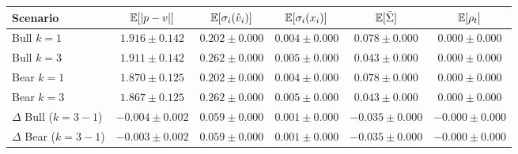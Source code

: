 \begin{tabular}{lccccc}
\hline
Scenario & $\mathbb{E}[|p-v|]$ & $\mathbb{E}[\sigma_i(\hat v_i)]$ & $\mathbb{E}[\sigma_i(x_i)]$ & $\mathbb{E}[\bar\Sigma]$ & $\mathbb{E}[\rho_t]$ \\
\hline
Bull $k=1$ & $1.916\pm0.142$ & $0.202\pm0.000$ & $0.004\pm0.000$ & $0.078\pm0.000$ & $0.000\pm0.000$ \\
Bull $k=3$ & $1.911\pm0.142$ & $0.262\pm0.000$ & $0.005\pm0.000$ & $0.043\pm0.000$ & $0.000\pm0.000$ \\
Bear $k=1$ & $1.870\pm0.125$ & $0.202\pm0.000$ & $0.004\pm0.000$ & $0.078\pm0.000$ & $0.000\pm0.000$ \\
Bear $k=3$ & $1.867\pm0.125$ & $0.262\pm0.000$ & $0.005\pm0.000$ & $0.043\pm0.000$ & $0.000\pm0.000$ \\
$\Delta$ Bull ($k=3-1$) & $-0.004\pm0.002$ & $0.059\pm0.000$ & $0.001\pm0.000$ & $-0.035\pm0.000$ & $-0.000\pm0.000$ \\
$\Delta$ Bear ($k=3-1$) & $-0.003\pm0.002$ & $0.059\pm0.000$ & $0.001\pm0.000$ & $-0.035\pm0.000$ & $-0.000\pm0.000$ \\
\hline
\end{tabular}
